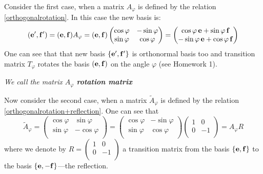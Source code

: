 \documentclass[12pt]{article}
\numberwithin{equation}{section}
\begin{document}
   Consider the first case, when a matrix $A_\varphi$ is defined by the relation \eqref{orthogonalrotation}.
In this case the new basis is:
    \begin{equation}\label{rotationofbasisontheangle}
   ({\bf e}',{\bf f}')=
   ({\bf e},{\bf f})
     A_\varphi=
     ({\bf e},{\bf f})
   \begin{pmatrix}
      \cos\varphi & -\sin\varphi \\
      \sin\varphi & \cos\varphi \\
    \end{pmatrix}
  =
            \begin{pmatrix}
    \cos\varphi \,{\bf e}+\sin\varphi \,{\bf f}\\
    -\sin\varphi\, {\bf e}+\cos\varphi \,{\bf f}\\
            \end{pmatrix}
            \end{equation}
One can see that that new basis $\{{\bf e}',{\bf f}'\}$ is orthonormal basis too and transition matrix $T_\varphi$
 rotates the basis
$({\bf e},{\bf f})$ on the angle $\varphi$ (see Homework 1).


{\it We call the matrix $A_\varphi$ {\bf rotation matrix}}
\m

   Now consider the second case, when a matrix $\tilde A_\varphi$ is defined by the relation \eqref{orthogonalrotation+reflection}.
   One can see that
                  \begin{equation}\label{secondcase-rotation}
    \tilde A_\varphi=\begin{pmatrix}
      \cos\varphi & \sin\varphi \\
      \sin\varphi & -\cos\varphi\\
       \end{pmatrix}=\begin{pmatrix}
      \cos\varphi & -\sin\varphi \\
      \sin\varphi & \cos\varphi\\
       \end{pmatrix}\begin{pmatrix}
      1 & 0 \\
      0 & -1\\
       \end{pmatrix}=A_\varphi R
\end{equation}
where we denote by $R=\begin{pmatrix}
      1 & 0 \\
      0 & -1\\
       \end{pmatrix}$ a transition matrix from the basis $\{{\bf e},{\bf f}\}$ to the basis $\{{\bf e},-{\bf f}\}$---the reflection.
\end{document}
